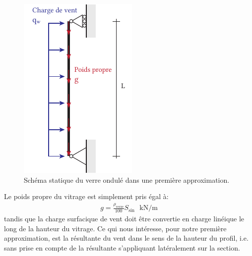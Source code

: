 \documentclass[11pt,titlepage]{article}
\begin{document}
\begin{figure}
 \includegraphics[width=\linewidth]{img/ondul/schem_stat.pdf}
    \caption{Schéma statique du verre ondulé dans une première approximation.}
\label{fig:ondul_stat}
\end{figure}

Le poids propre du vitrage est simplement pris égal à: 
\begin{align}
    g = \frac{\rho_{\text{verre}}}{100} S_{\text{sin}} \text{ }\unit{\kilo\newton/\meter}
\end{align}
tandis que la charge surfacique de vent doit être convertie en charge linéique le long de la hauteur du vitrage. Ce qui nous intéresse, pour notre première approximation, est la résultante du vent dans le sens de la hauteur du profil, i.e. sans prise en compte de la résultante s'appliquant latéralement sur la section.
\end{document}

